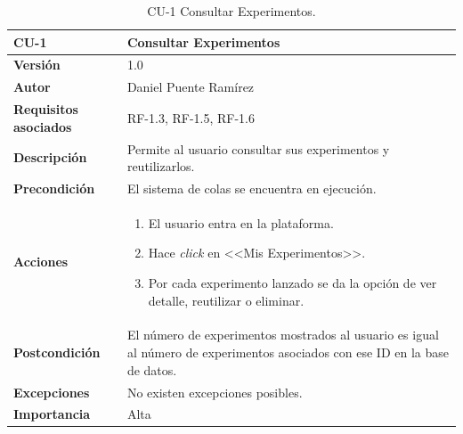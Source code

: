 \begin{table}[p]
\centering
\begin{tabularx}{\linewidth}{ p{} p{} }
\toprule
\textbf{CU-1} & \textbf{Consultar Experimentos}\\
\toprule
\textbf{Versión} & 1.0\\
\textbf{Autor} & Daniel Puente Ramírez\\
\textbf{Requisitos asociados} & RF-1.3, RF-1.5, RF-1.6\\
\textbf{Descripción} & Permite al usuario consultar sus experimentos y reutilizarlos.\\
\textbf{Precondición} & El sistema de colas se encuentra en ejecución.\\
\textbf{Acciones} &
\begin{enumerate}
\def\labelenumi{\arabic{enumi}.}
\tightlist
\item El usuario entra en la plataforma.
\item Hace \textit{click} en <<Mis Experimentos>>.
\item Por cada experimento lanzado se da la opción de ver detalle, reutilizar o eliminar.
\end{enumerate}\\
\textbf{Postcondición} & El número de experimentos mostrados al usuario es igual al número de experimentos asociados con ese ID en la base de datos.\\
\textbf{Excepciones} & No existen excepciones posibles.\\
\textbf{Importancia} & Alta \\
\bottomrule
\end{tabularx}
\caption{CU-1 Consultar Experimentos.}
\end{table}

